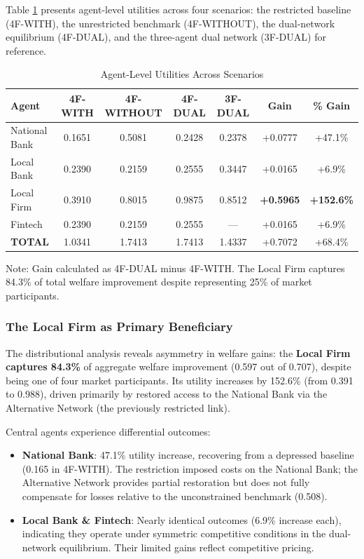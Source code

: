Table \ref{tab:utilities_comparison} presents agent-level utilities across four scenarios: the restricted baseline (4F-WITH), the unrestricted benchmark (4F-WITHOUT), the dual-network equilibrium (4F-DUAL), and the three-agent dual network (3F-DUAL) for reference.

\begin{table}[ht]
\centering
\caption{Agent-Level Utilities Across Scenarios}
\label{tab:utilities_comparison}
\begin{tabular}{lcccccc}
\toprule
\textbf{Agent} & \textbf{4F-WITH} & \textbf{4F-WITHOUT} & \textbf{4F-DUAL} & \textbf{3F-DUAL} & \textbf{Gain} & \textbf{\% Gain} \\
\midrule
National Bank  & 0.1651 & 0.5081 & 0.2428 & 0.2378 & +0.0777 & +47.1\% \\
Local Bank     & 0.2390 & 0.2159 & 0.2555 & 0.3447 & +0.0165 & +6.9\% \\
Local Firm     & 0.3910 & 0.8015 & 0.9875 & 0.8512 & \textbf{+0.5965} & \textbf{+152.6\%} \\
Fintech        & 0.2390 & 0.2159 & 0.2555 & — & +0.0165 & +6.9\% \\
\midrule
\textbf{TOTAL} & 1.0341 & 1.7413 & 1.7413 & 1.4337 & +0.7072 & +68.4\% \\
\bottomrule
\end{tabular}
\begin{tablenotes}
\small
\item Note: Gain calculated as 4F-DUAL minus 4F-WITH. The Local Firm captures 84.3\% of total welfare improvement despite representing 25\% of market participants.
\end{tablenotes}
\end{table}

\subsubsection{The Local Firm as Primary Beneficiary}

The distributional analysis reveals asymmetry in welfare gains: the \textbf{Local Firm captures 84.3\%} of aggregate welfare improvement (0.597 out of 0.707), despite being one of four market participants. Its utility increases by 152.6\% (from 0.391 to 0.988), driven primarily by restored access to the National Bank via the Alternative Network (the previously restricted link).

Central agents experience differential outcomes:
\begin{itemize}
    \item \textbf{National Bank}: 47.1\% utility increase, recovering from a depressed baseline (0.165 in 4F-WITH). The restriction imposed costs on the National Bank; the Alternative Network provides partial restoration but does not fully compensate for losses relative to the unconstrained benchmark (0.508).
    
    \item \textbf{Local Bank \& Fintech}: Nearly identical outcomes (6.9\% increase each), indicating they operate under symmetric competitive conditions in the dual-network equilibrium. Their limited gains reflect competitive pricing.
\end{itemize}

